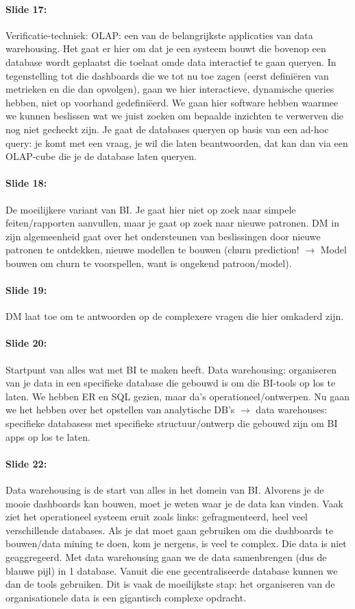 \documentclass[10pt,a4paper]{report}
\begin{document}
\paragraph{Slide 17:}Verificatie-techniek: OLAP: een van de belangrijkste applicaties van data warehousing. Het gaat er hier om dat je een systeem bouwt die bovenop een database wordt geplaatst die toelaat omde data interactief te gaan queryen. In tegenstelling tot die dashboards die we tot nu toe zagen (eerst definiëren van metrieken en die dan opvolgen), gaan we hier interactieve, dynamische queries hebben, niet op voorhand gedefiniëerd. We gaan hier software hebben waarmee we kunnen beslissen wat we juist zoeken om bepaalde inzichten te verwerven die nog niet gecheckt zijn. Je gaat de databases queryen op basis van een ad-hoc query: je komt met een vraag, je wil die laten beantwoorden, dat kan dan via een OLAP-cube die je de database laten queryen.

\paragraph{Slide 18:}De moeilijkere variant van BI. Je gaat hier niet op zoek naar simpele feiten/rapporten aanvullen, maar je gaat op zoek naar nieuwe patronen. DM in zijn algemeenheid gaat over het ondersteunen van beslissingen door nieuwe patronen te ontdekken, nieuwe modellen te bouwen (churn prediction! $\rightarrow$ Model bouwen om churn te voorspellen, want is ongekend patroon/model).

\paragraph{Slide 19:}DM laat toe om te antwoorden op de complexere vragen die hier omkaderd zijn.

\paragraph{Slide 20:}Startpunt van alles wat met BI te maken heeft. Data warehousing: organiseren van je data in een specifieke database die gebouwd is om die BI-tools op los te laten. We hebben ER en SQL gezien, maar da's operationeel/ontwerpen. Nu gaan we het hebben over het opstellen van analytische DB's $\rightarrow$ data warehouses: specifieke databasess met specifieke structuur/ontwerp die gebouwd zijn om BI apps op los te laten.

\paragraph{Slide 22:}Data warehousing is de start van alles in het domein van BI. Alvorens je de mooie dashboards kan bouwen, moet je weten waar je de data kan vinden. Vaak ziet het operationeel systeem eruit zoals links: gefragmenteerd, heel veel verschillende databases. Als je dat moet gaan gebruiken om die dashboards te bouwen/data mining te doen, kom je nergens, is veel te complex. Die data is niet geaggregeerd. Met data warehousing gaan we de data samenbrengen (dus de blauwe pijl) in 1 database. Vanuit die ene gecentraliseerde database kunnen we dan de tools gebruiken. Dit is vaak de moeilijkste stap: het organiseren van de organisationele data is een gigantisch complexe opdracht.
\end{document}
